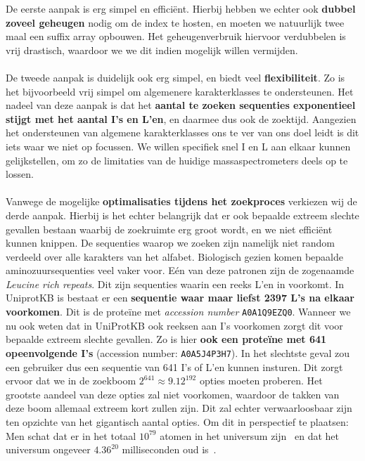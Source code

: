 De eerste aanpak is erg simpel en efficiënt.
Hierbij hebben we echter ook \textbf{dubbel zoveel geheugen} nodig om de index te hosten, en moeten we natuurlijk twee maal een suffix array opbouwen.
Het geheugenverbruik hiervoor verdubbelen is vrij drastisch, waardoor we we dit indien mogelijk willen vermijden.
\\ \\
De tweede aanpak is duidelijk ook erg simpel, en biedt veel \textbf{flexibiliteit}.
Zo is het bijvoorbeeld vrij simpel om algemenere karakterklasses te ondersteunen.
Het nadeel van deze aanpak is dat het \textbf{aantal te zoeken sequenties exponentieel stijgt met het aantal I's en L'en}, en daarmee dus ook de zoektijd.
Aangezien het ondersteunen van algemene karakterklasses ons te ver van ons doel leidt is dit iets waar we niet op focussen.
We willen specifiek snel I en L aan elkaar kunnen gelijkstellen, om zo de limitaties van de huidige massaspectrometers deels op te lossen.
\\ \\
Vanwege de mogelijke \textbf{optimalisaties tijdens het zoekproces} verkiezen wij de derde aanpak.
Hierbij is het echter belangrijk dat er ook bepaalde extreem slechte gevallen bestaan waarbij de zoekruimte erg groot wordt, en we niet efficiënt kunnen knippen.
De sequenties waarop we zoeken zijn namelijk niet random verdeeld over alle karakters van het alfabet.
Biologisch gezien komen bepaalde aminozuursequenties veel vaker voor.
Eén van deze patronen zijn de zogenaamde \textit{Leucine rich repeats}\cite{leucine_rich_repeats}.
Dit zijn sequenties waarin een reeks L'en in voorkomt.
In UniprotKB is bestaat er een \textbf{sequentie waar maar liefst 2397 L's na elkaar voorkomen}.
Dit is de proteïne met \textit{accession number} \texttt{A0A1Q9EZQ0}.
Wanneer we nu ook weten dat in UniProtKB ook reeksen aan I's voorkomen zorgt dit voor bepaalde extreem slechte gevallen.
Zo is hier \textbf{ook een proteïne met 641 opeenvolgende I's} (accession number: \texttt{A0A5J4P3H7}).
In het slechtste geval zou een gebruiker dus een sequentie van 641 I's of L'en kunnen insturen.
Dit zorgt ervoor dat we in de zoekboom $2^{641} \approx 9.12^{192}$ opties moeten proberen.
Het grootste aandeel van deze opties zal niet voorkomen, waardoor de takken van deze boom allemaal extreem kort zullen zijn.
Dit zal echter verwaarloosbaar zijn ten opzichte van het gigantisch aantal opties.
Om dit in perspectief te plaatsen: Men schat dat er in het totaal $10^{79}$ atomen in het universum zijn~\cite{atoms_in_universe} en dat het universum ongeveer $4.36^{20}$ milliseconden oud is~\cite{age_universe}.
